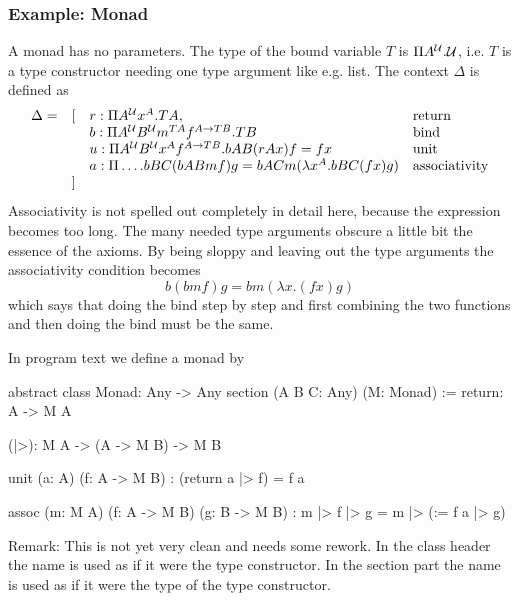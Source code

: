 \subsubsection{Example: Monad}

A monad has no parameters. The type of the bound variable $T$ is $\Pi
A^{\cal{U}}. {\cal{U}}$, i.e. $T$ is a type constructor needing one type argument like
e.g. list.  The context $\Delta$ is defined as
$$
\begin{array}{llll}
  \Delta =
  &[
  & r: \Pi A^{\cal{U}} x^A. T A,
  & \text{return}
  \\
  &
  & b: \Pi A^{\cal{U}} B^{\cal{U}} m^{T A} f^{A\to T B}. T B
  & \text{bind}
  \\
  &
  & u: \Pi A^{\cal{U}} B^{\cal{U}} x^A f^{A\to T B}. b A B (r A x) f = f x
  & \text{unit}
  \\
  &
  & a: \Pi \ldots . b B C (b A B m f) g = b A C m (\lambda x^A. b B C (f x) g)
  & \text{associativity}
  \\
  &]
\end{array}
$$
Associativity is not spelled out completely in detail here, because the
expression becomes too long. The many needed type arguments obscure a little
bit the essence of the axioms. By being sloppy and leaving out the type
arguments the associativity condition becomes
$$
  b (b m f) g = b m (\lambda x. (f x) g)
$$
which says that doing the bind step by step and first combining the two
functions and then doing the bind must be the same.

In program text we define a monad by
\begin{alba}
   abstract class
     Monad: Any -> Any
   section (A B C: Any) (M: Monad) :=
     return: A -> M A

     (|>): M A -> (A -> M B) -> M B

     unit (a: A)
          (f: A -> M B)
          : (return a |> f) = f a

     assoc (m: M A)
           (f: A -> M B)
           (g: B -> M B)
           : m |> f |> g  =  m |> (\a := f a |> g)
\end{alba}

Remark: This is not yet very clean and needs some rework. In the class header
the name  is used as if it were the type constructor. In the
section part the name is used as if it were the type of the type constructor.










